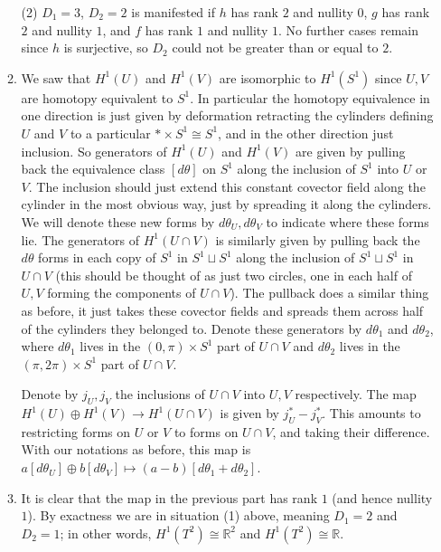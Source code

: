 \documentclass[11pt,leqno]{article}
\theoremstyle{plain}
\theoremstyle{definition}
\numberwithin{equation}{section}
\numberwithin{lem}{section}
\begin{document}
\begin{enumerate}
\begin{enumerate}
        (2) $D_1=3$, $D_2=2$ is manifested if $h$ has rank $2$ and nullity $0$, $g$ has rank $2$ and nullity $1$, and $f$ has rank $1$ and nullity $1$. No further cases remain since $h$ is surjective, so $D_2$ could not be greater than or equal to $2$.
        \item We saw that $H^1(U)$ and $H^1(V)$ are isomorphic to $H^1(S^1)$ since $U,V$ are homotopy equivalent to $S^1$. In particular the homotopy equivalence in one direction is just given by deformation retracting the cylinders defining $U$ and $V$ to a particular $\ast\times S^1\cong S^1$, and in the other direction just inclusion. So generators of $H^1(U)$ and $H^1(V)$ are given by pulling back the equivalence class $[d\theta]$ on $S^1$ along the inclusion of $S^1$ into $U$ or $V$. The inclusion should just extend this constant covector field along the cylinder in the most obvious way, just by spreading it along the cylinders. We will denote these new forms by $d\theta_U, d\theta_V$ to indicate where these forms lie. The generators of $H^1(U\cap V)$ is similarly given by pulling back the $d\theta$ forms in each copy of $S^1$ in $S^1\sqcup S^1$ along the inclusion of $S^1\sqcup S^1$ in $U\cap V$ (this should be thought of as just two circles, one in each half of $U,V$ forming the components of $U\cap V$). The pullback does a similar thing as before, it just takes these covector fields and spreads them across half of the cylinders they belonged to. Denote these generators by $d\theta_1$ and $d\theta_2$, where $d\theta_1$ lives in the $(0,\pi)\times S^1$ part of $U\cap V$ and $d\theta_2$ lives in the $(\pi,2\pi)\times S^1$ part of $U\cap V$.
        
        Denote by $j_U,j_V$ the inclusions of $U\cap V$ into $U,V$ respectively. The map $H^1(U)\oplus H^1(V)\to H^1(U\cap V)$ is given by $j_U^\ast - j_V^\ast$. This amounts to restricting forms on $U$ or $V$ to forms on $U\cap V$, and taking their difference. With our notations as before, this map is $a[d\theta_U] \oplus b[d\theta_V]\mapsto (a-b)[d\theta_1 + d\theta_2]$.
        \item It is clear that the map in the previous part has rank $1$ (and hence nullity $1$). By exactness we are in situation (1) above, meaning $D_1=2$ and $D_2=1$; in other words, $H^1(T^2)\cong \mathbb R^2$ and $H^1(T^2)\cong \mathbb R$.
    \end{enumerate}
\end{enumerate}
\end{document}
